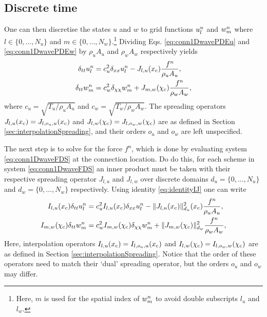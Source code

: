 \subsection{Discrete time}
One can then discretise the states $u$ and $w$ to grid functions $u_l^n$ and $w_m^n$ where $l\in \{0, \hdots, N_u\}$ and $m\in \{0, \hdots, N_w\}$.\footnote{Here, $m$ is used for the spatial index of $w_m^n$ to avoid double subscripts $l_u$ and $l_w$.} Dividing  Eqs. \eqref{eq:conn1DwavePDEu} and \eqref{eq:conn1DwavePDEw} by $\rho_u A_u$ and $\rho_w A_w$ respectively yields
\begin{subequations}\label{eq:conn1DwaveFDS}
    \begin{align}
        \delta_{tt} u_l^n &= c_u^2 \delta_{xx} u_l^n -J_{l, u}(x_{\text{c}})\frac{f^n}{\rho_u A_u}, \label{eq:conn1DwaveFDSu} \\
        \delta_{tt} w_m^n &= c_w^2 \delta_{\chi\chi} w_m^n + J_{m, w}(\chi_{\text{c}})\frac{f^n}{\rho_w A_w},\label{eq:conn1DwaveFDSw}
    \end{align}
\end{subequations}
where $c_u = \sqrt{T_u / \rho_uA_u}$ and $c_w = \sqrt{T_w / \rho_wA_w}$. The spreading operators $J_{l, u}(x_{\text{c}}) = J_{l, o_u, u}(x_{\text{c}})$ and $J_{l, w}(\chi_{\text{c}}) = J_{l, o_w, w}(\chi_{\text{c}})$ are as defined in Section \ref{sec:interpolationSpreading}, and their orders $o_u$ and $o_w$ are left unspecified. 

The next step is to solve for the force $f^n$, which is done by evaluating system \eqref{eq:conn1DwaveFDS} at the connection location. Do do this, for each scheme in system \eqref{eq:conn1DwaveFDS} an inner product must be taken with their respective spreading operator $J_{l, u}$ and $J_{l, w}$ over discrete domains $d_u = \{0, \hdots, N_u\}$ and $d_w = \{0, \hdots, N_w\}$ respectively.
Using identity \eqref{eq:identityIJ} one can write
\begin{subequations}\label{eq:conn1DwaveFDSXc}
    \begin{align}
        I_{l, u}(x_{\text{c}})\delta_{tt} u_l^n &= c_u^2 I_{l, u}(x_{\text{c}})\delta_{xx} u_l^n -\lVert J_{l, u}(x_{\text{c}})\rVert_{d_u}^2(x_{\text{c}})\frac{f^n}{\rho_u A_u}, \label{eq:conn1DwaveuXc} \\
        I_{m, w}(\chi_{\text{c}})\delta_{tt} w_m^n &= c_w^2 I_{m, w}(\chi_{\text{c}})\delta_{\chi\chi} w_m^n + \lVert J_{m, w}(\chi_{\text{c}})\rVert_{d_w}^2\frac{f^n}{\rho_w A_w},\label{eq:conn1DwavewXc}
    \end{align}
\end{subequations}
Here, interpolation operators $I_{l, u}(x_{\text{c}}) = I_{l, o_u, u}(x_{\text{c}})$ and $I_{l, w}(\chi_{\text{c}}) = I_{l, o_w, w}(\chi_{\text{c}})$ are as defined in Section \ref{sec:interpolationSpreading}. Notice that the order of these operators need 
to match their `dual' spreading operator, but the orders $o_u$ and $o_w$ may differ.


